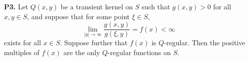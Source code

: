 \textbf{P3.} Let $Q(x,y)$ be a transient kernel on $S$ such that $g(x,y) > 0$ for all $x,y \in S$, and suppose that for some point $\xi \in S$,
$$\lim_{|y| \to \infty} \frac{g(x,y)}{g(\xi,y)} = f(x) < \infty$$
exists for all $x \in S$. Suppose further that $f(x)$ is $Q$-regular. Then the positive multiples of $f(x)$ are the only $Q$-regular functions on $S$.
